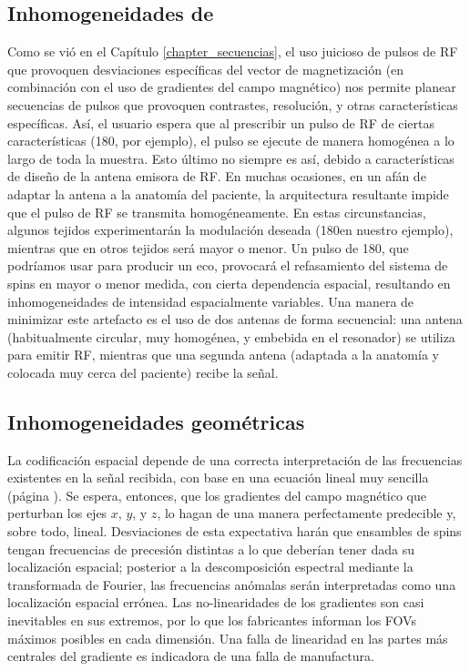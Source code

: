 \subsection{Inhomogeneidades de \Bone}
Como se vió en el Capítulo \ref{chapter_secuencias}, el uso juicioso de pulsos de RF que provoquen desviaciones específicas del vector de magnetización (en combinación con el uso de gradientes del campo magnético) nos permite planear secuencias de pulsos que provoquen contrastes, resolución, y otras características específicas. Así, el usuario espera que al prescribir un pulso de RF de ciertas características (180\degrees, por ejemplo), el pulso se ejecute de manera homogénea a lo largo de toda la muestra. Esto último no siempre es así, debido a características de diseño de la antena emisora de RF. En muchas ocasiones, en un afán de adaptar la antena a la anatomía del paciente, la arquitectura resultante impide que el pulso de RF se transmita homogéneamente. En estas circunstancias, algunos tejidos experimentarán la modulación deseada (180\degrees en nuestro ejemplo), mientras que en otros tejidos será mayor o menor. Un pulso de 180\degrees, que podríamos usar para producir un eco, provocará el refasamiento del sistema de spins en mayor o menor medida, con cierta dependencia espacial, resultando en inhomogeneidades de intensidad espacialmente variables. Una manera de minimizar este artefacto es el uso de dos antenas de forma secuencial: una antena (habitualmente circular, muy homogénea, y embebida en el resonador) se utiliza para emitir RF, mientras que una segunda antena (adaptada a la anatomía y colocada muy cerca del paciente) recibe la señal.

\subsection{Inhomogeneidades geométricas}
La codificación espacial depende de una correcta interpretación de las frecuencias existentes en la señal recibida, con base en una ecuación lineal muy sencilla (página \pageref{eq_LarmorGradientes}). Se espera, entonces, que los gradientes del campo magnético que perturban los ejes $x$, $y$, y $z$, lo hagan de una manera perfectamente predecible y, sobre todo, lineal. Desviaciones de esta expectativa harán que ensambles de spins tengan frecuencias de precesión distintas a lo que deberían tener dada su localización espacial; posterior a la descomposición espectral mediante la transformada de Fourier, las frecuencias anómalas serán interpretadas como una localización espacial errónea. Las no-linearidades de los gradientes son casi inevitables en sus extremos, por lo que los fabricantes informan los FOVs máximos posibles en cada dimensión. Una falla de linearidad en las partes más centrales del gradiente es indicadora de una falla de manufactura.



